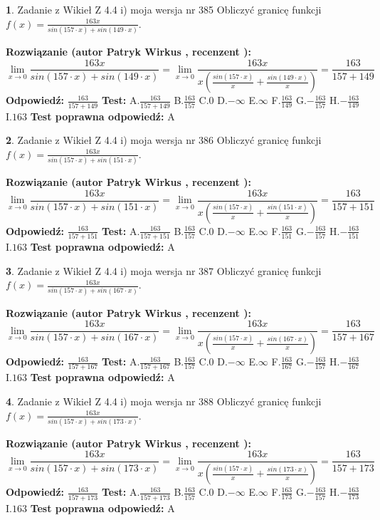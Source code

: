 \documentclass[12pt, a4paper]{article}
\theoremstyle{definition} %
\newtheorem{zad}{}
\newcommand{\zadStart}[1]{\begin{zad}#1\newline}
\newcommand{\zadStop}{\end{zad}}
\newcommand{\rozwStart}[2]{\noindent \textbf{Rozwiązanie (autor #1 , recenzent #2): }\newline}
\newcommand{\rozwStop}{\newline}
\newcommand{\odpStart}{\noindent \textbf{Odpowiedź:}\newline}
\newcommand{\odpStop}{\newline}
\newcommand{\testStart}{\noindent \textbf{Test:}\newline}
\newcommand{\testStop}{\newline}
\newcommand{\kluczStart}{\noindent \textbf{Test poprawna odpowiedź:}\newline}
\newcommand{\kluczStop}{\newline}
\begin{document}
\zadStart{Zadanie z Wikieł Z 4.4 i) moja wersja nr 385}
Obliczyć granicę funkcji $f(x)=\frac{163x}{sin(157\cdot x) +sin(149\cdot x)}$.
\zadStop
\rozwStart{Patryk Wirkus}{}
$$\lim\limits_{x\to 0}\frac{163x}{sin(157\cdot x) +sin(149\cdot x)}=\lim\limits_{x\to 0}\frac{163x}{x(\frac{sin(157\cdot x)}{x}+\frac{sin(149\cdot x)}{x})}=\frac{163}{157+149}$$
\rozwStop
\odpStart
$\frac{163}{157+149}$
\odpStop
\testStart
A.$\frac{163}{157+149}$
B.$\frac{163}{157}$
C.$0$
D.$-\infty$
E.$\infty$
F.$\frac{163}{149}$
G.$-\frac{163}{157}$
H.$-\frac{163}{149}$
I.$163$
\testStop
\kluczStart
A
\kluczStop



\zadStart{Zadanie z Wikieł Z 4.4 i) moja wersja nr 386}
Obliczyć granicę funkcji $f(x)=\frac{163x}{sin(157\cdot x) +sin(151\cdot x)}$.
\zadStop
\rozwStart{Patryk Wirkus}{}
$$\lim\limits_{x\to 0}\frac{163x}{sin(157\cdot x) +sin(151\cdot x)}=\lim\limits_{x\to 0}\frac{163x}{x(\frac{sin(157\cdot x)}{x}+\frac{sin(151\cdot x)}{x})}=\frac{163}{157+151}$$
\rozwStop
\odpStart
$\frac{163}{157+151}$
\odpStop
\testStart
A.$\frac{163}{157+151}$
B.$\frac{163}{157}$
C.$0$
D.$-\infty$
E.$\infty$
F.$\frac{163}{151}$
G.$-\frac{163}{157}$
H.$-\frac{163}{151}$
I.$163$
\testStop
\kluczStart
A
\kluczStop



\zadStart{Zadanie z Wikieł Z 4.4 i) moja wersja nr 387}
Obliczyć granicę funkcji $f(x)=\frac{163x}{sin(157\cdot x) +sin(167\cdot x)}$.
\zadStop
\rozwStart{Patryk Wirkus}{}
$$\lim\limits_{x\to 0}\frac{163x}{sin(157\cdot x) +sin(167\cdot x)}=\lim\limits_{x\to 0}\frac{163x}{x(\frac{sin(157\cdot x)}{x}+\frac{sin(167\cdot x)}{x})}=\frac{163}{157+167}$$
\rozwStop
\odpStart
$\frac{163}{157+167}$
\odpStop
\testStart
A.$\frac{163}{157+167}$
B.$\frac{163}{157}$
C.$0$
D.$-\infty$
E.$\infty$
F.$\frac{163}{167}$
G.$-\frac{163}{157}$
H.$-\frac{163}{167}$
I.$163$
\testStop
\kluczStart
A
\kluczStop



\zadStart{Zadanie z Wikieł Z 4.4 i) moja wersja nr 388}
Obliczyć granicę funkcji $f(x)=\frac{163x}{sin(157\cdot x) +sin(173\cdot x)}$.
\zadStop
\rozwStart{Patryk Wirkus}{}
$$\lim\limits_{x\to 0}\frac{163x}{sin(157\cdot x) +sin(173\cdot x)}=\lim\limits_{x\to 0}\frac{163x}{x(\frac{sin(157\cdot x)}{x}+\frac{sin(173\cdot x)}{x})}=\frac{163}{157+173}$$
\rozwStop
\odpStart
$\frac{163}{157+173}$
\odpStop
\testStart
A.$\frac{163}{157+173}$
B.$\frac{163}{157}$
C.$0$
D.$-\infty$
E.$\infty$
F.$\frac{163}{173}$
G.$-\frac{163}{157}$
H.$-\frac{163}{173}$
I.$163$
\testStop
\kluczStart
A
\kluczStop
\end{document}
